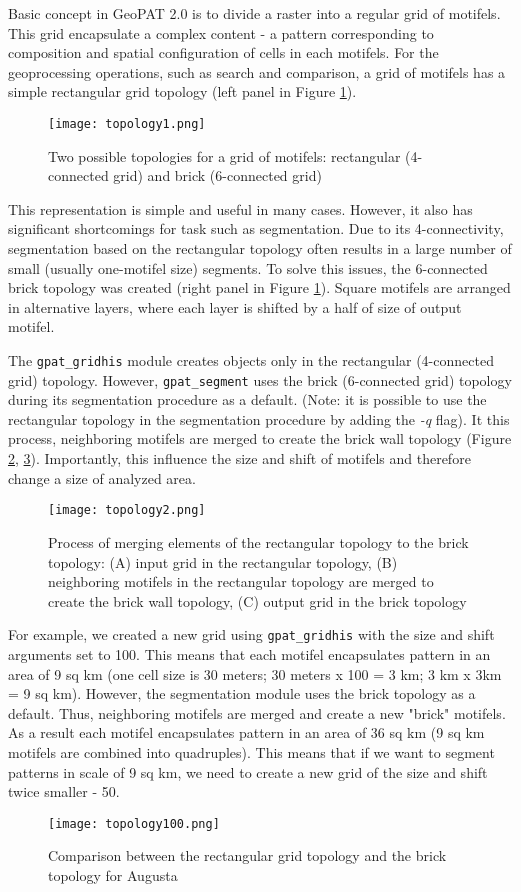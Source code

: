 
Basic concept in GeoPAT 2.0 is to divide a raster into a regular grid of motifels.
This grid encapsulate a complex content - a pattern corresponding to composition and spatial configuration of cells in each motifels.
For the geoprocessing operations, such as search and comparison, a grid of motifels has a simple rectangular grid topology (left panel in Figure \ref{FIG:TOPO1}). 

\begin{figure}[H]
	\centering
	\texttt{[image: topology1.png]}
	\caption{Two possible topologies for a grid of motifels: rectangular (4-connected grid) and brick (6-connected grid)}
	\label{FIG:TOPO1}
\end{figure}

This representation is simple and useful in many cases.
However, it also has significant shortcomings for task such as segmentation.
Due to its 4-connectivity, segmentation based on the rectangular topology often results in a large number of small (usually one-motifel size) segments.
To solve this issues, the 6-connected brick topology was created (right panel in Figure \ref{FIG:TOPO1}).
Square motifels are arranged in alternative layers, where each layer is shifted by a half of size of output motifel.

The {\tt gpat\_gridhis} module creates objects only in the rectangular (4-connected grid) topology. 
However, {\tt gpat\_segment} uses the brick (6-connected grid) topology during its segmentation procedure as a default.
(Note: it is possible to use the rectangular topology in the segmentation procedure by adding the {\it -q} flag).
It this process, neighboring motifels are merged to create the brick wall topology (Figure \ref{FIG:TOPO2}, \ref{FIG:TOPO3}).
Importantly, this influence the size and shift of motifels and therefore change a size of analyzed area.

\begin{figure}[H]
	\centering
	\texttt{[image: topology2.png]}
	\caption{Process of merging elements of the rectangular topology to the brick topology: (A) input grid in the rectangular topology, (B) neighboring motifels in the rectangular topology are merged to create the brick wall topology, (C) output grid in the brick topology}
	\label{FIG:TOPO2}
\end{figure}

For example, we created a new grid using {\tt gpat\_gridhis} with the size and shift arguments set to 100.
This means that each motifel encapsulates pattern in an area of 9 sq km (one cell size is 30 meters; 30 meters x 100 = 3 km; 3 km x 3km = 9 sq km).
However, the segmentation module uses the brick topology as a default.
Thus, neighboring motifels are merged and create a new "brick" motifels.
As a result each motifel encapsulates pattern in an area of 36 sq km (9 sq km motifels are combined into quadruples).
This means that if we want to segment patterns in scale of 9 sq km, we need to create a new grid of the size and shift twice smaller - 50.

\begin{figure}[H]
	\centering
	\texttt{[image: topology100.png]}
	\caption{Comparison between the rectangular grid topology and the brick topology for Augusta}
	\label{FIG:TOPO3}
\end{figure}
